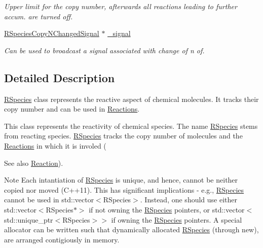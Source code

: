 \begin{DoxyCompactItemize}
\begin{DoxyCompactList}\small\item\em Upper limit for the copy number, afterwards all reactions leading to further accum. are turned off. \end{DoxyCompactList}\item 
\hyperlink{namespacechem_a6cb4144586460e7b7ae0dffdf08eb57c}{R\-Species\-Copy\-N\-Changed\-Signal} $\ast$ \hyperlink{classchem_1_1RSpecies_acd60296c77857284cd935cb6faaf4200}{\-\_\-signal}
\begin{DoxyCompactList}\small\item\em Can be used to broadcast a signal associated with change of n of. \end{DoxyCompactList}\end{DoxyCompactItemize}


\subsection{Detailed Description}
\hyperlink{classchem_1_1RSpecies}{R\-Species} class represents the reactive aspect of chemical molecules. It tracks their copy number and can be used in \hyperlink{classchem_1_1Reaction}{Reactions}. 

This class represents the reactivity of chemical species. The name \hyperlink{classchem_1_1RSpecies}{R\-Species} stems from reacting species. \hyperlink{classchem_1_1RSpecies}{R\-Species} tracks the copy number of molecules and the \hyperlink{classchem_1_1Reaction}{Reactions} in which it is involed (\begin{DoxySeeAlso}{See also}
\hyperlink{classchem_1_1Reaction}{Reaction}). 
\end{DoxySeeAlso}
\begin{DoxyNote}{Note}
Each intantiation of \hyperlink{classchem_1_1RSpecies}{R\-Species} is unique, and hence, cannot be neither copied nor moved (C++11). This has significant implications -\/ e.\-g., \hyperlink{classchem_1_1RSpecies}{R\-Species} cannot be used in std\-::vector$<$\-R\-Species$>$. Instead, one should use either std\-::vector$<$\-R\-Species$\ast$$>$ if not owning the \hyperlink{classchem_1_1RSpecies}{R\-Species} pointers, or std\-::vector$<$std\-::unique\-\_\-ptr$<$\-R\-Species$>$$>$ if owning the \hyperlink{classchem_1_1RSpecies}{R\-Species} pointers. A special allocator can be written such that dynamically allocated \hyperlink{classchem_1_1RSpecies}{R\-Species} (through new), are arranged contigiously in memory. 
\end{DoxyNote}


